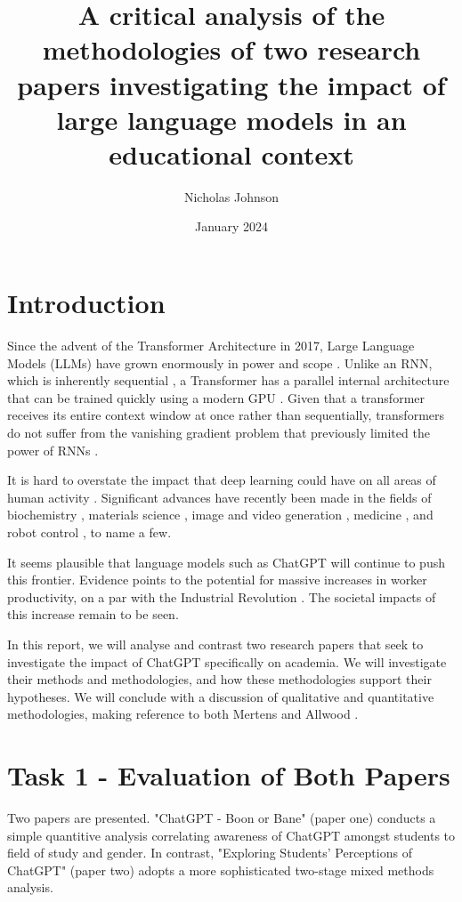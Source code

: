 \documentclass[12pt]{article}
\title{A critical analysis of the methodologies of two research papers investigating the impact of large language models in an educational context}
\author{Nicholas Johnson}
\date{January 2024}
\begin{document}
\maketitle

\section{Introduction}

Since the advent of the Transformer Architecture in 2017, Large Language Models (LLMs) have grown enormously in power and scope \cite{kaplan2020scaling}. Unlike an RNN, which is inherently sequential \cite{cho2014learning}, a Transformer has a parallel internal architecture that can be trained quickly using a modern GPU \cite{vaswani}. Given that a transformer receives its entire context window at once rather than sequentially, transformers do not suffer from the vanishing gradient problem that previously limited the power of RNNs \cite{hochreiter, kuchaiev2018factorization}. 

It is hard to overstate the impact that deep learning could have on all areas of human activity \cite{noy}. Significant advances have recently been made in the fields of biochemistry \cite{alphafold}, materials science \cite{Merchant2023}, image and video generation \cite{ho2020denoising, yang2023diffusion}, medicine \cite{Wong2023}, and robot control \cite{anymal}, to name a few. 

It seems plausible that language models such as ChatGPT will continue to push this frontier. Evidence points to the potential for massive increases in worker productivity, on a par with the Industrial Revolution \cite{noy}. The societal impacts of this increase remain to be seen.

In this report, we will analyse and contrast two research papers that seek to investigate the impact of ChatGPT specifically on academia. We will investigate their methods and methodologies, and how these methodologies support their hypotheses. We will conclude with a discussion of qualitative and quantitative methodologies, making reference to both Mertens \cite{mertens} and Allwood \cite{allwood}.


\section{Task 1 - Evaluation of Both Papers}

Two papers are presented. "ChatGPT - Boon or Bane" (paper one) \cite{paper1} conducts a simple quantitive analysis correlating awareness of ChatGPT amongst students to field of study and gender. In contrast, "Exploring Students' Perceptions of ChatGPT" (paper two) \cite{paper2} adopts a more sophisticated two-stage mixed methods analysis.
\end{document}
